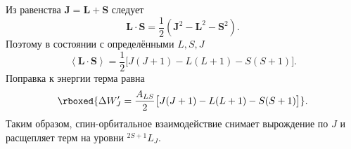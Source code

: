 \documentclass[../final.tex]{subfiles}
\begin{document}
Из равенства \(\mathbf J=\mathbf L+\mathbf S\) следует
\begin{equation*}
    \mathbf L\cdot\mathbf S
    =\frac12\left(\mathbf J^2-\mathbf L^2-\mathbf S^2\right).
\end{equation*}
Поэтому в состоянии с определёнными \(L,S,J\)
\begin{equation*}
    \left\langle\mathbf L\cdot\mathbf S\right\rangle
    =\frac12\bigl[J(J+1)-L(L+1)-S(S+1)\bigr].
\end{equation*}
Поправка к энергии терма равна
\begin{equation*}
    \rboxed{\Delta W'_J=
    \frac{A_{LS}}{2}
    \bigl[J(J+1)-L(L+1)-S(S+1)\bigr]}.
\end{equation*}
Таким образом, спин-орбитальное взаимодействие снимает вырождение
по \(J\) и расщепляет терм на уровни \({}^{2S+1}L_J\).
\end{document}
